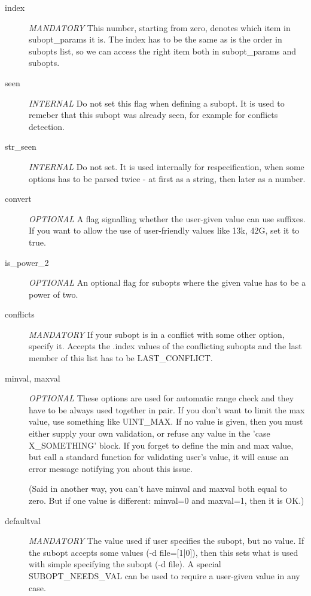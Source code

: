 \begin{description}
\item[index] {\em MANDATORY}
    This number, starting from zero, denotes which item in subopt\_params
    it is. The index has to be the same as is the order in subopts list,
    so we can access the right item both in subopt\_params and subopts.

\item[seen] {\em INTERNAL}
    Do not set this flag when defining a subopt. It is used to remeber that
    this subopt was already seen, for example for conflicts detection.

\item[str\_seen] {\em INTERNAL}
    Do not set. It is used internally for respecification, when some options
    has to be parsed twice - at first as a string, then later as a number.

\item[convert] {\em OPTIONAL}
    A flag signalling whether the user-given value can use suffixes.
    If you want to allow the use of user-friendly values like 13k, 42G,
    set it to true.

\item[is\_power\_2] {\em OPTIONAL}
    An optional flag for subopts where the given value has to be a power
    of two.

\item[conflicts] {\em MANDATORY}
    If your subopt is in a conflict with some other option, specify it.
    Accepts the .index values of the conflicting subopts and the last
    member of this list has to be LAST\_CONFLICT.

\item[minval, maxval] {\em OPTIONAL}
    These options are used for automatic range check and they have to be
    always used together in pair. If you don't want to limit the max value,
    use something like UINT\_MAX. If no value is given, then you must either
    supply your own validation, or refuse any value in the 'case
    X\_SOMETHING' block. If you forget to define the min and max value, but
    call a standard function for validating user's value, it will cause an
    error message notifying you about this issue.

    (Said in another way, you can't have minval and maxval both equal
    to zero. But if one value is different: minval=0 and maxval=1,
    then it is OK.)

\item[defaultval] {\em MANDATORY}
    The value used if user specifies the subopt, but no value.
    If the subopt accepts some values (-d file=[1|0]), then this
    sets what is used with simple specifying the subopt (-d file).
    A special SUBOPT\_NEEDS\_VAL can be used to require a user-given
    value in any case.
		
\end{description}

